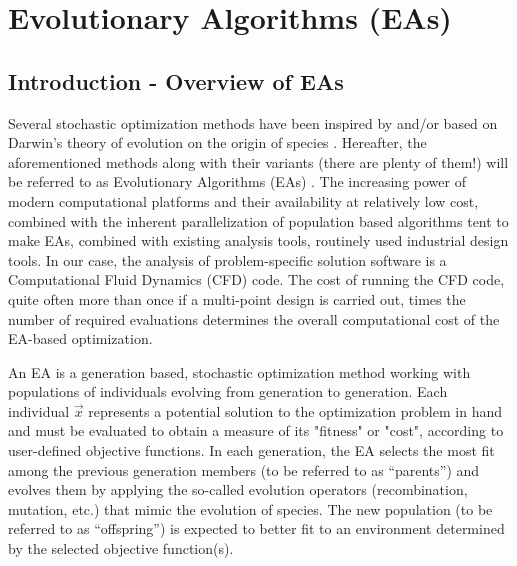 \chapter{Evolutionary Algorithms (EAs)} %


\ifpdf
    \graphicspath{{2/figures/PNG/}{2/figures/PDF/}{2/figures/}}
\else
    \graphicspath{{2/figures/EPS/}{2/figures/}}
\fi


\section{Introduction - Overview of EAs}
\label{EAintro}
Several stochastic optimization methods have been inspired by and/or based on Darwin's theory of evolution on the origin of species \cite{Darwin}. Hereafter, the aforementioned methods along with their variants (there are plenty of them!) will be referred to as Evolutionary Algorithms (EAs) \cite{HowToSolveIt}. The increasing power of modern computational platforms and their availability at relatively low cost, combined with the inherent parallelization of population based algorithms tent to make EAs, combined with existing analysis tools, routinely used industrial design tools. In our case, the analysis of problem-specific solution software is a Computational Fluid Dynamics (CFD) code. The cost of running the CFD code, quite often more than once if a multi-point design is carried out, times the number of required evaluations determines the overall computational cost of the EA-based optimization.      

An EA is a generation based, stochastic optimization method working with populations of individuals evolving from generation to generation. Each individual $\vec{x}$ represents a potential solution to the optimization problem in hand and must be evaluated to obtain a measure of its "fitness" or "cost", according to user-defined objective functions. In each generation, the EA selects the most fit among the previous generation members (to be referred to as ``parents'') and evolves them by applying the so-called evolution operators (recombination, mutation, etc.) that mimic the evolution of species. The new population (to be referred to as ``offspring'') is expected to better fit to an environment determined by the selected objective function(s).     

